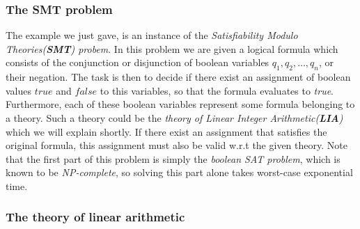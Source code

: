 	\subsubsection{The SMT problem}
	
	The example we just gave, is an instance of the \emph{Satisfiability Modulo Theories(\textbf{SMT}) probem}. In this problem we are given a logical formula which consists of the conjunction or disjunction of boolean variables $q_1, q_2, \ldots, q_n$, or their negation. The task is then to decide if there exist an assignment of boolean values $true$ and $false$ to this variables, so that the formula evaluates to \emph{true}. Furthermore, each of these boolean variables represent some formula belonging to a theory. Such a theory could be the \emph{theory of Linear Integer Arithmetic(\textbf{LIA})} which we will explain shortly. If there exist an assignment that satisfies the original formula, this assignment must also be valid w.r.t the given theory. Note that the first part of this problem is simply the \emph{boolean SAT problem}, which is known to be \emph{NP-complete}, so solving this part alone takes worst-case exponential time. %
	
	
	\subsubsection{The theory of linear arithmetic}
	
	
	
	